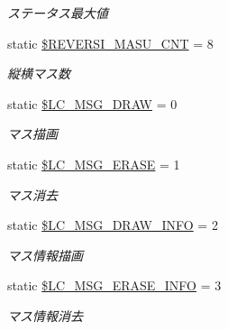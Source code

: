 \begin{DoxyCompactItemize}
\begin{DoxyCompactList}\small\item\em ステータス最大値 \end{DoxyCompactList}\item 
\mbox{\label{class_reversi_const_a1346cd55e42c8ed965831ea2eba3e26f}} 
static \hyperlink{class_reversi_const_a1346cd55e42c8ed965831ea2eba3e26f}{\$\+R\+E\+V\+E\+R\+S\+I\+\_\+\+M\+A\+S\+U\+\_\+\+C\+NT} = 8
\begin{DoxyCompactList}\small\item\em 縦横マス数 \end{DoxyCompactList}\item 
\mbox{\label{class_reversi_const_af2cfd84202bbe2dfb22250be713aea65}} 
static \hyperlink{class_reversi_const_af2cfd84202bbe2dfb22250be713aea65}{\$\+L\+C\+\_\+\+M\+S\+G\+\_\+\+D\+R\+AW} = 0
\begin{DoxyCompactList}\small\item\em マス描画 \end{DoxyCompactList}\item 
\mbox{\label{class_reversi_const_af1e58340af7831eaf0458fe771f51119}} 
static \hyperlink{class_reversi_const_af1e58340af7831eaf0458fe771f51119}{\$\+L\+C\+\_\+\+M\+S\+G\+\_\+\+E\+R\+A\+SE} = 1
\begin{DoxyCompactList}\small\item\em マス消去 \end{DoxyCompactList}\item 
\mbox{\label{class_reversi_const_a522738851ab060cd14ce3ffa1618000e}} 
static \hyperlink{class_reversi_const_a522738851ab060cd14ce3ffa1618000e}{\$\+L\+C\+\_\+\+M\+S\+G\+\_\+\+D\+R\+A\+W\+\_\+\+I\+N\+FO} = 2
\begin{DoxyCompactList}\small\item\em マス情報描画 \end{DoxyCompactList}\item 
\mbox{\label{class_reversi_const_a8ad50be0a297eea01df37fd8ba20d353}} 
static \hyperlink{class_reversi_const_a8ad50be0a297eea01df37fd8ba20d353}{\$\+L\+C\+\_\+\+M\+S\+G\+\_\+\+E\+R\+A\+S\+E\+\_\+\+I\+N\+FO} = 3
\begin{DoxyCompactList}\small\item\em マス情報消去 \end{DoxyCompactList}\item 

\end{DoxyCompactItemize}
